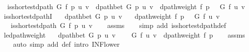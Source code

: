 \begin{isabellebody}
\ \ {\isachardoublequoteopen}is{\isacharunderscore}{\kern0pt}shortest{\isacharunderscore}{\kern0pt}dpath\ G\ f\ p\ u\ v\ {\isasymequiv}\ dpath{\isacharunderscore}{\kern0pt}bet\ G\ p\ u\ v\ {\isasymand}\ dpath{\isacharunderscore}{\kern0pt}weight\ f\ p\ {\isacharequal}{\kern0pt}\ {\isasymdelta}\ G\ f\ u\ v{\isachardoublequoteclose}\isanewline
%
\isadeliminvisible
\isanewline
%
\endisadeliminvisible
%
\isataginvisible
{}\isamarkupfalse%
\ is{\isacharunderscore}{\kern0pt}shortest{\isacharunderscore}{\kern0pt}dpathI{\isacharcolon}{\kern0pt}\isanewline
\ \ \ {\isachardoublequoteopen}dpath{\isacharunderscore}{\kern0pt}bet\ G\ p\ u\ v{\isachardoublequoteclose}\isanewline
\ \ \ {\isachardoublequoteopen}dpath{\isacharunderscore}{\kern0pt}weight\ f\ p\ {\isacharequal}{\kern0pt}\ {\isasymdelta}\ G\ f\ u\ v{\isachardoublequoteclose}\isanewline
\ \ \ {\isachardoublequoteopen}is{\isacharunderscore}{\kern0pt}shortest{\isacharunderscore}{\kern0pt}dpath\ G\ f\ p\ u\ v{\isachardoublequoteclose}%
\endisataginvisible
{\isafoldinvisible}%
%
\isadeliminvisible
\isanewline
%
\endisadeliminvisible
%
\isadelimproof
\ \ %
\endisadelimproof
%
\isatagproof
{}\isamarkupfalse%
\ assms\isanewline
\ \ \isamarkupfalse%
\ {\isacharparenleft}{\kern0pt}simp\ add{\isacharcolon}{\kern0pt}\ is{\isacharunderscore}{\kern0pt}shortest{\isacharunderscore}{\kern0pt}dpath{\isacharunderscore}{\kern0pt}def{\isacharparenright}{\kern0pt}%
\endisatagproof
{\isafoldproof}%
%
\isadelimproof
\isanewline
%
\endisadelimproof
%
\isadeliminvisible
\isanewline
%
\endisadeliminvisible
%
\isataginvisible
{}\isamarkupfalse%
\ {\isasymdelta}{\isacharunderscore}{\kern0pt}le{\isacharunderscore}{\kern0pt}dpath{\isacharunderscore}{\kern0pt}weight{\isacharcolon}{\kern0pt}\isanewline
\ \ \ {\isachardoublequoteopen}dpath{\isacharunderscore}{\kern0pt}bet\ G\ p\ u\ v{\isachardoublequoteclose}\isanewline
\ \ \ {\isachardoublequoteopen}{\isasymdelta}\ G\ f\ u\ v\ {\isasymle}\ dpath{\isacharunderscore}{\kern0pt}weight\ f\ p{\isachardoublequoteclose}%
\endisataginvisible
{\isafoldinvisible}%
%
\isadeliminvisible
\isanewline
%
\endisadeliminvisible
%
\isadelimproof
\ \ %
\endisadelimproof
%
\isatagproof
{}\isamarkupfalse%
\ assms\isanewline
\ \ \isamarkupfalse%
\ {\isacharparenleft}{\kern0pt}auto\ simp\ add{\isacharcolon}{\kern0pt}\ {\isasymdelta}{\isacharunderscore}{\kern0pt}def\ intro{\isacharcolon}{\kern0pt}\ INF{\isacharunderscore}{\kern0pt}lower{\isacharparenright}{\kern0pt}%

\end{isabellebody}
